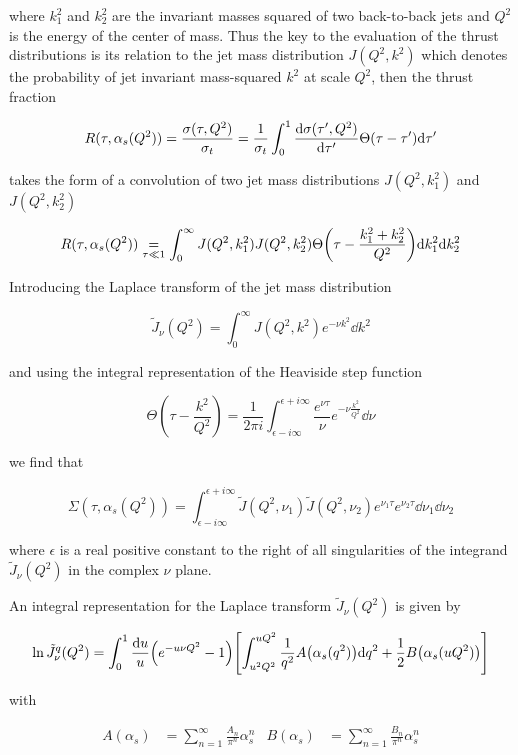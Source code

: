 \documentclass[../main.tex]{subfiles}
\begin{document}
where $k_1^2$ and $k_2^2$ are the invariant masses squared of two back-to-back jets and $Q^2$ is the energy of the center of mass.
Thus the key to the evaluation of the thrust distributions is its relation to the jet mass distribution $J(Q^2,k^2)$ which denotes
the probability of jet invariant mass-squared $k^2$ at scale $Q^2$, then the thrust fraction 

\begin{equation}
    R(\tau,\alpha_s(Q^2)) = \frac{\sigma(\tau,Q^2)}{\sigma_t} = \frac{1}{\sigma_t} 
    \int_0^1 \dv{\sigma(\tau',Q^2)}{\tau'} \Theta (\tau - \tau') \dd \tau'
\end{equation}

takes the form of a convolution of two jet mass distributions $J(Q^2,k_1^2)$ and $J(Q^2,k_2^2)$

\begin{equation}
    R(\tau,\alpha_s(Q^2)) \underset{\tau \ll 1}{=} \int_0^\infty J(Q^2,k_1^2) J(Q^2,k_2^2) \Theta\qty(\tau - \frac{k_1^2+k_2^2}{Q^2}) \dd k_1^2 \dd k_2^2
\end{equation}

Introducing the Laplace transform of the jet mass distribution

\begin{equation}\label{eq:laplace_jet_mass}
    \tilde{J}_\nu(Q^2) = \int_0^\infty J(Q^2,k^2) e^{-\nu k^2} \dd k^2 
\end{equation}

and using the integral representation of the Heaviside step function

\begin{equation}
    \Theta(\tau - \frac{k^2}{Q^2}) = \frac{1}{2\pi i} \int_{\epsilon-i\infty}^{\epsilon+i\infty} \frac{e^{\nu \tau}}{\nu} e^{- \nu \frac{k^2}{Q^2}} \dd \nu
\end{equation}

we find that 

\begin{equation}
    \Sigma(\tau,\alpha_s(Q^2)) = \int_{\epsilon - i \infty}^{\epsilon+i\infty} \tilde{J}(Q^2,\nu_1) \tilde{J}(Q^2,\nu_2) e^{\nu_1 \tau} e^{\nu_2 \tau} \dd \nu_1 \dd \nu_2
\end{equation}

where $\epsilon$ is a real positive constant to the right of all singularities of the integrand $\tilde{J}_\nu(Q^2)$ in the complex $\nu$ plane. 

An integral representation for the Laplace transform $\tilde{J}_\nu(Q^2)$ is given by

\begin{equation}\label{eq:master_formula}
    \ln \tilde{J}_\nu^q(Q^2) = \int_0^1 \frac{\dd u}{u} \qty(e^{-u \nu Q^2}-1)\qty[ \int_{u^2 Q^2}^{u Q^2} \frac{1}{q^2} A\qty(\alpha_s(q^2)) \dd q^2 + \frac{1}{2} B\qty(\alpha_s(u Q^2))]
\end{equation}

with 

\begin{align*}
    A(\alpha_s) &= \sum_{n=1}^\infty \frac{A_n}{\pi^n}\alpha_s^n & B(\alpha_s) &= \sum_{n=1}^\infty \frac{B_n}{\pi^n}\alpha_s^n
\end{align*}
\end{document}
